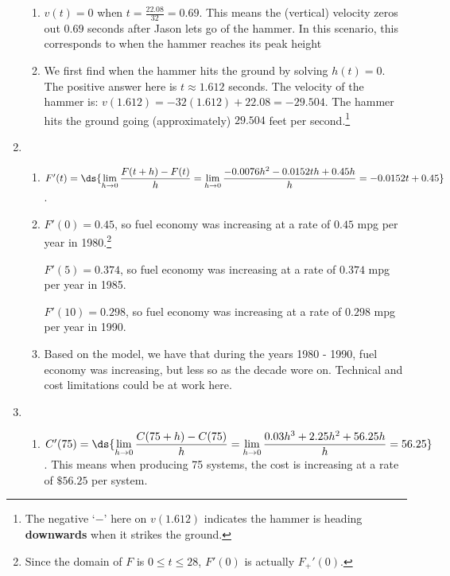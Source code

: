\documentclass{ximera}
\begin{document}
\begin{enumerate}
\begin{enumerate}
\item  $v(t) = 0$  when $t = \frac{22.08}{32} = 0.69$.  This means the (vertical) velocity zeros out $0.69$ seconds after Jason lets go of the hammer.  In this scenario, this corresponds to when the hammer reaches its peak height

\item  We first find when the hammer hits the ground by solving $h(t) = 0$.  The positive answer here is   $t \approx 1.612$ seconds.  The velocity of the hammer is:  $v(1.612) = -32(1.612) + 22.08 = -29.504$.  The hammer hits the ground going (approximately) $29.504$ feet per second.\footnote{The negative `$-$' here on $v(1.612)$ indicates the hammer is heading \textbf{downwards} when it strikes the ground.}

\end{enumerate}

\item  \begin{enumerate}  \item  $F'(t) = \ds{\lim_{h \rightarrow 0} \dfrac{F(t + h) - F(t)}{h} = \lim_{h \rightarrow 0} \dfrac{-0.0076h^{2} -0.0152th+0.45h}{h} =-0.0152t + 0.45}$.

\item   $F'(0) = 0.45$, so fuel economy was increasing at a rate of $0.45$ mpg per year in 1980.\footnote{Since the domain of $F$ is $0 \leq t \leq 28$, $F'(0)$ is actually $F_{+}'(0)$.}

\smallskip

 $F'(5) = 0.374$,  so fuel economy was increasing at a rate of $0.374$ mpg per year in 1985. 
 
 \smallskip
 
  $F'(10) = 0.298$,  so fuel economy was increasing at a rate of $0.298$ mpg  per year in 1990. 

\item  Based on the model, we have that during the years 1980 - 1990, fuel economy was increasing, but less so as the decade wore on.  Technical and cost limitations could be at work here.

\end{enumerate}

\item   \begin{enumerate}  \item   $C'(75) = \ds{\lim_{h \rightarrow 0} \dfrac{C(75+h) - C(75)}{h}  =     \lim_{h \rightarrow 0} \dfrac{0.03h^{3}+2.25h^{2}+56.25h}{h} = 56.25}$.  This means when producing 75 systems, the cost is increasing at a rate of $\$ 56.25$ per system.


\end{enumerate}
\end{enumerate}
\end{document}
